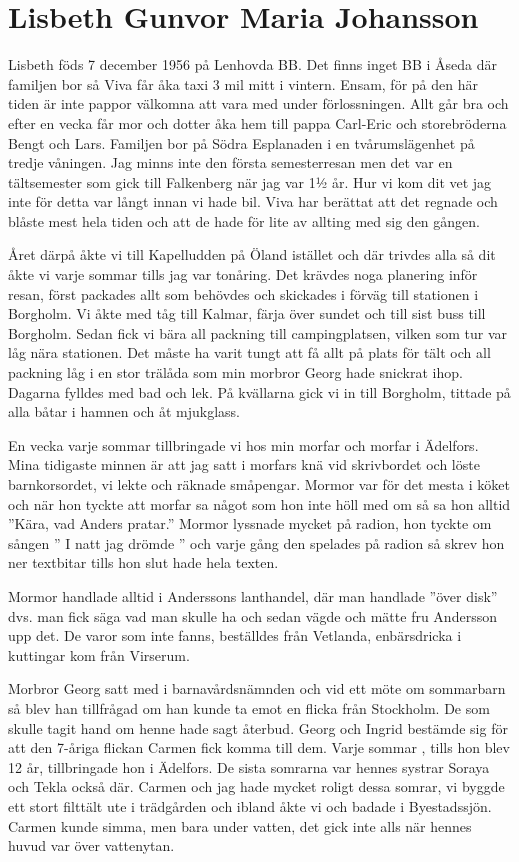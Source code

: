\chapter{Lisbeth Gunvor Maria Johansson}
\label{lisbeth_gunvor_maria_johansson}
Lisbeth föds 7 december 1956 på Lenhovda BB. Det finns inget BB i Åseda där familjen bor så Viva får åka taxi 3 mil mitt i vintern. Ensam, för på den här tiden är inte pappor välkomna att vara med under förlossningen.  Allt går bra och efter en vecka får mor och dotter åka hem till pappa Carl-Eric och storebröderna Bengt och Lars. Familjen bor på Södra Esplanaden i en tvårumslägenhet på tredje våningen. 
Jag minns inte den första semesterresan men det var en tältsemester som gick till Falkenberg när jag var 1½ år. Hur vi kom dit vet jag inte för detta var långt innan vi hade bil. Viva har berättat att det regnade och blåste mest hela tiden och att de hade för lite av allting med sig den gången.

Året därpå åkte vi till Kapelludden på Öland istället och där trivdes alla så dit åkte vi varje sommar tills jag var tonåring. Det krävdes noga planering inför resan, först packades allt som behövdes och skickades i förväg till stationen i Borgholm. Vi åkte med tåg till Kalmar, färja över sundet och till sist buss till Borgholm. Sedan fick vi bära all packning till campingplatsen, vilken som tur var låg nära stationen. Det måste ha varit tungt att få allt på plats för tält och all packning låg i en stor trälåda som min morbror Georg hade snickrat ihop. Dagarna fylldes med bad och lek. På kvällarna gick vi in till Borgholm, tittade på alla båtar i hamnen och åt mjukglass.

En vecka varje sommar tillbringade vi hos min morfar och morfar i Ädelfors. Mina tidigaste minnen är att jag satt i morfars knä vid skrivbordet och löste barnkorsordet, vi lekte och räknade småpengar. Mormor var för det mesta i köket och när hon tyckte att morfar sa något som hon inte höll med om så sa hon alltid ”Kära, vad Anders pratar.” 
Mormor lyssnade mycket på radion, hon tyckte om sången ” I natt jag drömde ” och varje gång den spelades på radion så skrev hon ner textbitar tills hon slut hade hela texten.

Mormor handlade alltid i Anderssons lanthandel, där man handlade ”över disk” dvs. man fick säga vad man skulle ha och sedan vägde och mätte fru Andersson upp det. De varor som inte fanns, beställdes från Vetlanda, enbärsdricka i kuttingar kom från Virserum.

Morbror Georg satt med i barnavårdsnämnden och vid ett möte om sommarbarn så blev han tillfrågad om han kunde ta emot en flicka från Stockholm. De som skulle tagit hand om henne hade sagt återbud. Georg och Ingrid bestämde sig för att den 7-åriga flickan Carmen fick komma till dem. Varje sommar , tills hon blev 12 år, tillbringade hon i Ädelfors. De sista somrarna var hennes systrar Soraya och Tekla också där. Carmen och jag hade mycket roligt dessa somrar, vi byggde ett stort filttält ute i trädgården och ibland åkte vi och badade i Byestadssjön. Carmen kunde simma, men bara under vatten, det gick inte alls när hennes huvud var över vattenytan.